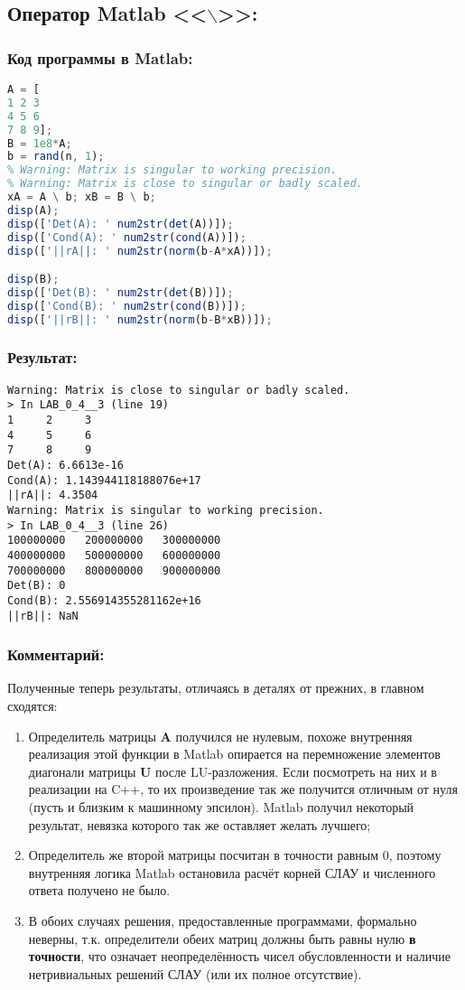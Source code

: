 \subsection{Оператор Matlab <<$\backslash$>>:}
\subsubsection{Код программы в Matlab:}
\begin{lstlisting}[language=octave]
A = [
1 2 3
4 5 6
7 8 9];
B = 1e8*A;
b = rand(n, 1);
% Warning: Matrix is singular to working precision.
% Warning: Matrix is close to singular or badly scaled.
xA = A \ b; xB = B \ b;
disp(A);
disp(['Det(A): ' num2str(det(A))]);
disp(['Cond(A): ' num2str(cond(A))]);
disp(['||rA||: ' num2str(norm(b-A*xA))]);

disp(B);
disp(['Det(B): ' num2str(det(B))]);
disp(['Cond(B): ' num2str(cond(B))]);
disp(['||rB||: ' num2str(norm(b-B*xB))]);
\end{lstlisting}
\subsubsection{Результат:}
{\singlespacing
\begin{verbatim}
Warning: Matrix is close to singular or badly scaled.
> In LAB_0_4__3 (line 19)
1     2     3
4     5     6
7     8     9
Det(A): 6.6613e-16
Cond(A): 1.143944118188076e+17
||rA||: 4.3504
Warning: Matrix is singular to working precision.
> In LAB_0_4__3 (line 26)
100000000   200000000   300000000
400000000   500000000   600000000
700000000   800000000   900000000
Det(B): 0
Cond(B): 2.556914355281162e+16
||rB||: NaN
\end{verbatim}}
\subsubsection{Комментарий:}
Полученные теперь результаты, отличаясь в деталях от прежних, в главном сходятся:
\begin{enumerate}
    \item Определитель матрицы $\mathbf{A}$ получился не нулевым, похоже внутренняя реализация этой функции в Matlab опирается на перемножение элементов диагонали матрицы $\mathbf{U}$ после LU-разложения. Если посмотреть на них и в реализации на C++, то их произведение так же получится отличным от нуля (пусть и близким к машинному эпсилон). Matlab получил некоторый результат, невязка которого так же оставляет желать лучшего;

    \item Определитель же второй матрицы посчитан в точности равным 0, поэтому внутренняя логика Matlab остановила расчёт корней СЛАУ и численного ответа получено не было.

    \item В обоих случаях решения, предоставленные программами, формально неверны, т.к. определители обеих матриц должны быть равны нулю {\bf в точности}, что означает неопределённость чисел обусловленности и наличие нетривиальных решений СЛАУ (или их полное отсутствие).
\end{enumerate}

